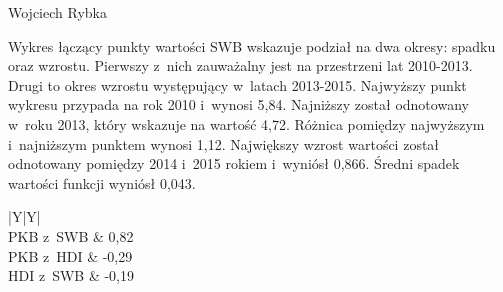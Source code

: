 \begin{artplenv}{Wojciech Rybka}
%
%

Wykres łączący punkty wartości SWB wskazuje podział na dwa okresy: spadku oraz wzrostu. Pierwszy z~nich zauważalny jest
na przestrzeni lat 2010-2013. Drugi to okres wzrostu występujący w~latach 2013-2015. Najwyższy punkt wykresu przypada
na rok 2010 i~wynosi 5,84. Najniższy został odnotowany w~roku 2013, który wskazuje na wartość 4,72. Różnica pomiędzy
najwyższym i~najniższym punktem wynosi 1,12.  Największy wzrost wartości został odnotowany pomiędzy 2014 i~2015 rokiem
i~wyniósł 0,866. Średni spadek wartości funkcji wyniósł 0,043.

\captionsetup[table]{name=Tabela}
\begin{table}[H]
	\begin{tabularx}{\textwidth}{|Y|Y|}
		\hline
		\\\hline
		PKB z~SWB &
		0,82\\\hline
		PKB z~HDI &
		-0,29\\\hline
		HDI z~SWB &
		{}-0,19\\\hline
	\end{tabularx}
	
	\caption{Wartości związku pomiędzy wskaźnikami Grecji.
		Źródło: obliczenia własne na podstawie
		\parencite{international_monetary_fund_world_2019a,united_nations_development_programme_human_2019,noauthor_world_2018}.
	}
	\label{tab5:ryb}
\end{table}


%


\end{artplenv}
